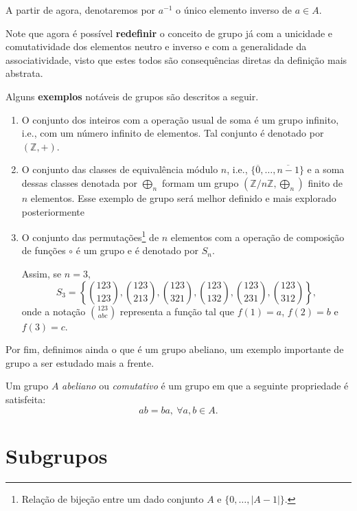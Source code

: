 \documentclass[11pt,openany]{book}
\newcommand{\separate}{\vspace{1.5em}}
\begin{document}
    A partir de agora, denotaremos por $a^{-1}$ o único elemento inverso de $a \in A$.

    Note que agora é possível \textbf{redefinir} o conceito de grupo já com a unicidade e comutatividade dos elementos neutro e inverso e com a generalidade da associatividade, visto que estes todos são consequências diretas da definição mais abstrata.

    \separate

    Alguns \textbf{exemplos} notáveis de grupos são descritos a seguir.

    \begin{enumerate}[label=Exemplo \arabic*),align=left]
        \item O conjunto dos inteiros com a operação usual de soma é um grupo infinito, i.e., com um número infinito de elementos. Tal conjunto é denotado por $(\mathbb{Z}, +)$.
        
        \item O conjunto das classes de equivalência módulo $n$, i.e., $\{\overline{0}, \dots, \overline{n-1}\}$ e a soma dessas classes denotada por $\bigoplus\limits_{n}$ formam um grupo $(\mathbb{Z}/n\mathbb{Z}, \bigoplus\limits_{n})$ finito de $n$ elementos. Esse exemplo de grupo será melhor definido e mais explorado posteriormente
        
        \item O conjunto das permutações\footnote{Relação de bijeção entre um dado conjunto $A$ e $\{0,\dots, |A-1|\}$.} de $n$ elementos com a operação de composição de funções $\circ$ é um grupo e é denotado por $S_n$.
        \par Assim, se $n=3$,
        \[S_3 = \left\{\binom{123}{123}, \binom{123}{213}, \binom{123}{321}, \binom{123}{132}, \binom{123}{231}, \binom{123}{312}\right\},\]
        onde a notação $\binom{123}{abc}$ representa a função tal que $f(1)=a$, $f(2) = b$ e $f(3) = c$.
    \end{enumerate}

    Por fim, definimos ainda o que é um grupo abeliano, um exemplo importante de grupo a ser estudado mais a frente.
    \begin{definition}
    \label{def:abeliano}
        Um grupo $A$ \textit{abeliano} ou \textit{comutativo} é um grupo em que a seguinte propriedade é satisfeita:
        \[ab = ba, \ \forall a,b \in A.\]
    \end{definition}

\chapter{Subgrupos}
\end{document}
